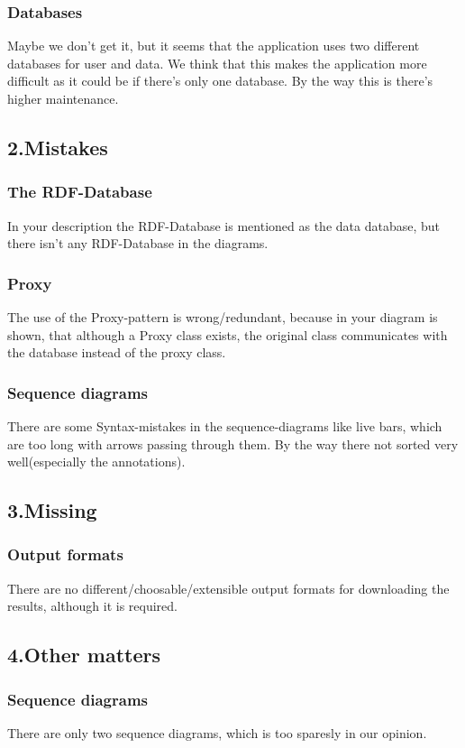 \documentclass{article}
\begin{document}
\subsubsection{Databases}
Maybe we don't get it, but it seems that the application uses two different databases for user and data. We think that this makes the application more difficult as it could be if there's only one database. By the way this is there's higher maintenance.
\subsection{2.Mistakes}
\subsubsection{The RDF-Database}
In your description the RDF-Database is mentioned as the data database, but there isn't any RDF-Database in the diagrams.
\subsubsection{Proxy}
The use of the Proxy-pattern is wrong/redundant, because in your diagram is shown, that although a Proxy class exists, the original class communicates with the database instead of the proxy class.
\subsubsection{Sequence diagrams}
There are some Syntax-mistakes in the sequence-diagrams like live bars, which are too long with arrows passing through them. By the way there not sorted very well(especially the annotations).
\subsection{3.Missing}
\subsubsection{Output formats}
There are no different/choosable/extensible output formats for downloading the results, although it is required.
\subsection{4.Other matters}
\subsubsection{Sequence diagrams}
There are only two sequence diagrams, which is too sparesly in our opinion.
\end{document}
